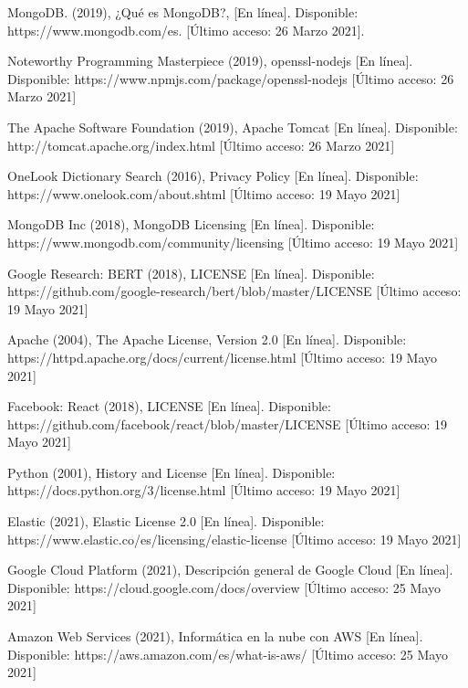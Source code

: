 \documentclass[12pt, a4paper, titlepage]{report}
\begin{document}
\begin{thebibliography}{20}
	
	
	MongoDB. (2019), ¿Qué es MongoDB?, [En línea]. Disponible: https://www.mongodb.com/es. [Último acceso: 26 Marzo 2021].
	
	Noteworthy Programming Masterpiece (2019), openssl-nodejs [En línea]. Disponible: https://www.npmjs.com/package/openssl-nodejs [Último acceso: 26 Marzo 2021]
	
	The Apache Software Foundation (2019), Apache Tomcat [En línea]. Disponible: http://tomcat.apache.org/index.html [Último acceso: 26 Marzo 2021]
	
	OneLook Dictionary Search (2016), Privacy Policy [En línea]. Disponible: https://www.onelook.com/about.shtml [Último acceso: 19 Mayo 2021]
	
	MongoDB Inc (2018), MongoDB Licensing [En línea]. Disponible: https://www.mongodb.com/community/licensing [Último acceso: 19 Mayo 2021]
	
	Google Research: BERT (2018), LICENSE [En línea]. Disponible: https://github.com/google-research/bert/blob/master/LICENSE [Último acceso: 19 Mayo 2021]
	
	Apache (2004), The Apache License, Version 2.0 [En línea]. Disponible: https://httpd.apache.org/docs/current/license.html [Último acceso: 19 Mayo 2021]
	
	Facebook: React (2018), LICENSE [En línea]. Disponible: https://github.com/facebook/react/blob/master/LICENSE [Último acceso: 19 Mayo 2021]
	
	Python (2001), History and License [En línea]. Disponible: https://docs.python.org/3/license.html [Último acceso: 19 Mayo 2021]
	
	Elastic (2021), Elastic License 2.0 [En línea]. Disponible: https://www.elastic.co/es/licensing/elastic-license [Último acceso: 19 Mayo 2021]
	
	Google Cloud Platform (2021), Descripción general de Google Cloud [En línea]. Disponible: https://cloud.google.com/docs/overview [Último acceso: 25 Mayo 2021]
	
	Amazon Web Services (2021), Informática en la nube con AWS [En línea]. Disponible: https://aws.amazon.com/es/what-is-aws/ [Último acceso: 25 Mayo 2021]
	

\end{thebibliography}
\end{document}
